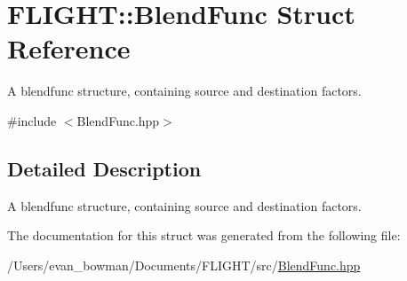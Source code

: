 \hypertarget{struct_f_l_i_g_h_t_1_1_blend_func}{}\section{F\+L\+I\+G\+HT\+:\+:Blend\+Func Struct Reference}
\label{struct_f_l_i_g_h_t_1_1_blend_func}


A blendfunc structure, containing source and destination factors.  




{\ttfamily \#include $<$Blend\+Func.\+hpp$>$}



\subsection{Detailed Description}
A blendfunc structure, containing source and destination factors. 

The documentation for this struct was generated from the following file\+:\begin{DoxyCompactItemize}
\item 
/\+Users/evan\+\_\+bowman/\+Documents/\+F\+L\+I\+G\+H\+T/src/\hyperlink{_blend_func_8hpp}{Blend\+Func.\+hpp}\end{DoxyCompactItemize}

